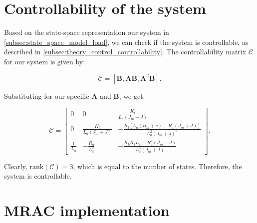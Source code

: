 \section{Controllability of the system}%
\label{sec:controllability}
Based on the state-space representation our system in \cref{subsec:state_space_model_load}, we can check if the system is controllable, as described in \cref{subsec:theory_control_controllability}. The controllability matrix $\mathcal{C}$ for our system is given by:

\begin{equation}
    \label{eq:model_controllability}
    \mathcal{C} = [\mathbf{B}, \mathbf{A}\mathbf{B}, \mathbf{A}^2\mathbf{B}].
\end{equation}

Substituting for our specific $\mathbf{A}$ and $\mathbf{B}$, we get:

\begin{equation}
    \mathcal{C} = 
    \begin{bmatrix}
        0 & 0 & \frac{K_t}{L_a (J_m+J)}\\
        0 & \frac{K_t}{L_a (J_m+J)} & -\frac{K_t [L_a (B_m+c) + R_a (J_m+J)]}{L_a^2 (J_m+J)^2}\\
        \frac{1}{L_a} & -\frac{R_a}{L_a^2} & -\frac{K_b K_t L_a+R_a^2 (J_m+J)}{L_a^3 (J_m+J)}
    \end{bmatrix}.
\end{equation}

Clearly, $\mathrm{rank}(\mathcal{C}) = 3$, which is equal to the number of states. Therefore, the system is controllable.

\section{MRAC implementation}%
\label{sec:mrac_implementation}

